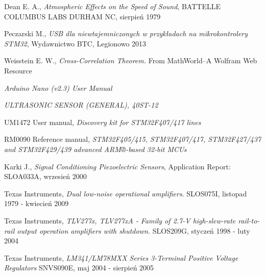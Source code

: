 \begin{thebibliography}{99}


    Dean E. A., \textit{Atmospheric Effects on the Speed of Sound}, 
  BATTELLE COLUMBUS LABS DURHAM NC, sierpień 1979

   Peczarski M., 
  \textit{USB dla niewtajemniczonych w przykładach na mikrokontrolery STM32}, Wydawnictwo BTC, Legionowo 2013

   Weisstein E. W., 
  \textit{Cross-Correlation Theorem.} From MathWorld--A Wolfram Web Resource 

  \textit{Arduino Nano (v2.3) User Manual}
  
  \textit{ULTRASONIC SENSOR (GENERAL), 40ST-12}

   UM1472 User manual, \textit{Discovery kit for STM32F407/417 lines}

   RM0090 Reference manual,
\textit{STM32F405/415, STM32F407/417, STM32F427/437 and
STM32F429/439 advanced ARM®-based 32-bit MCUs}
  
   Karki J., \textit{Signal Conditioning Piezoelectric Sensors}, 
  Application Report: SLOA033A, wrzesień 2000

    Texas Instruments, \textit{Dual low-noise operational amplifiers}. SLOS075I, listopad 1979 - kwiecień 2009

    Texas Instruments, \textit{TLV277x, TLV277xA - Family of 2.7-V high-slew-rate rail-to-rail output operation amplifiers with shutdown.}
  SLOS209G, styczeń 1998 - luty 2004
  
   Texas Instruments, \textit{LM341/LM78MXX Series 3-Terminal Positive Voltage Regulators}
  SNVS090E, maj 2004 - sierpień 2005
  


\end{thebibliography}
